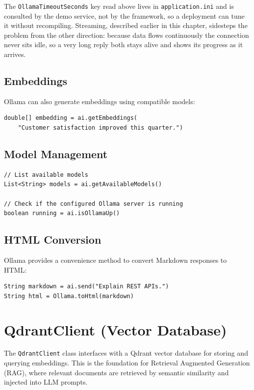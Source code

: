 \noindent
The \texttt{OllamaTimeoutSeconds} key read above lives in \texttt{application.ini}
and is consulted by the demo service, not by the framework, so a deployment can
tune it without recompiling.  Streaming, described earlier in this chapter,
sidesteps the problem from the other direction: because data flows continuously
the connection never sits idle, so a very long reply both stays alive and shows
its progress as it arrives.

\subsection{Embeddings}

Ollama can also generate embeddings using compatible models:

\begin{lstlisting}[style=groovy]
double[] embedding = ai.getEmbeddings(
    "Customer satisfaction improved this quarter.")
\end{lstlisting}

\subsection{Model Management}

\begin{lstlisting}[style=groovy]
// List available models
List<String> models = ai.getAvailableModels()

// Check if the configured Ollama server is running
boolean running = ai.isOllamaUp()
\end{lstlisting}

\subsection{HTML Conversion}

Ollama provides a convenience method to convert Markdown responses to HTML:

\begin{lstlisting}[style=groovy]
String markdown = ai.send("Explain REST APIs.")
String html = Ollama.toHtml(markdown)
\end{lstlisting}

\section{QdrantClient (Vector Database)}
\label{sec:llm-qdrant}

The \texttt{QdrantClient} class interfaces with a Qdrant vector database for storing and querying embeddings.  This is the foundation for Retrieval Augmented Generation (RAG), where relevant documents are retrieved by semantic similarity and injected into LLM prompts.

